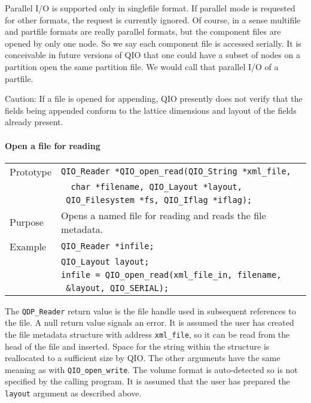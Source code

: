 \documentclass{article}
\newcommand{\QIOstring}{{\tt QIO\_String }}
\begin{document}
Parallel I/O is supported only in singlefile format.  If parallel mode
is requested for other formats, the request is currently ignored.  Of
course, in a sense multifile and partfile formats are really parallel
formats, but the component files are opened by only one node.  So we
say each component file is accessed serially.  It is conceivable in
future versions of QIO that one could have a subset of nodes on a
partition open the same partition file.  We would call that parallel
I/O of a partfile.

Caution: If a file is opened for appending, QIO presently does not
verify that the fields being appended conform to the lattice
dimensions and layout of the fields already present.


\paragraph{Open a file for reading}

\begin{flushleft}
  \begin{tabular}{|l|l|}
  \hline
  Prototype      & \verb|QIO_Reader *QIO_open_read(|\QIOstring \verb|*xml_file,|\\
                 & \verb|  char *filename, QIO_Layout *layout, |\\
                 & \verb| QIO_Filesystem *fs, QIO_Iflag *iflag);| \\
  Purpose        & Opens a named file for reading and reads the file metadata. \\
\hline
  Example  & \verb|QIO_Reader *infile;| \\
           & \verb|QIO_Layout layout;| \\
           & \verb|infile = QIO_open_read(xml_file_in, filename,|\\
           & \verb| &layout, QIO_SERIAL);| \\
   \hline
 \end{tabular}
\end{flushleft}
%
The \verb|QDP_Reader| return value is the file handle used in
subsequent references to the file.  A null return value signals an
error.  It is assumed the user has created the file metadata structure
with address \verb|xml_file|, so it can be read from the head of the
file and inserted.  Space for the string within the structure is
reallocated to a sufficient size by QIO.  The other arguments have the
same meaning as with \verb|QIO_open_write|.  The volume format is
auto-detected so is not specified by the calling program.  It is
assumed that the user has prepared the \verb|layout| argument as
described above.
\end{document}
